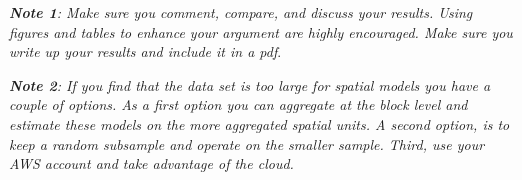 \documentclass[12pt,onecolumn]{article}
\begin{document}
\begin{enumerate}
\begin{enumerate}
  \end{enumerate}
  {\it {\bf Note 1}: Make sure you comment, compare, and discuss your results. Using figures and tables to enhance your argument are highly encouraged. Make sure you write up your results and include it in a pdf}.

  {\it {\bf Note 2}: If you find that the data set is too large for spatial models you have a couple of options. As a first option you can aggregate at the block level and estimate these models on the more aggregated spatial units. A second option, is to keep a random subsample and operate on the smaller sample. Third, use your AWS account and take advantage of the cloud.}
\end{enumerate}
\end{document}
